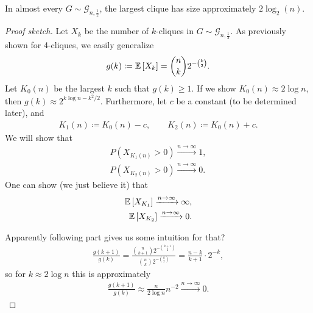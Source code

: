 \begin{theorem}
    In almost every $G \sim \mathcal{G}_{n, \frac{1}{2}}$, the largest clique has size approximately $2 \log_2(n)$.
\end{theorem}
\begin{proof}[Proof sketch]
    Let $X_k$ be the number of $k$-cliques in $G \sim \mathcal{G}_{n, \frac{1}{2}}$.
    As previously shown for 4-cliques, we easily generalize
    \begin{align*}
        g(k) \coloneqq \mathbb{E}\left[X_k\right] = \binom{n}{k}2^{-\binom{k}{2}}.
    \end{align*}
    Let $K_0(n)$ be the largest $k$ such that $g(k) \geq 1$.
    If we show $K_0(n) \approx 2 \log n$, then $g(k) \approx 2^{k\log n - k^2/2}$.
    Furthermore, let $c$ be a constant (to be determined later), and
    \begin{align}
        K_1(n) \coloneqq K_0(n) - c,\qquad K_2(n) \coloneqq K_0(n) + c.
    \end{align}
    We will show that
    \begin{align}
        P(X_{K_1(n)} > 0) \xrightarrow{n \rightarrow \infty} 1, \label{eq:ugly_probK1} \\
        P(X_{K_2(n)} > 0) \xrightarrow{n \rightarrow \infty} 0. \label{eq:ugly_probK2}
    \end{align}
    One can show (we just believe it) that
    \begin{align}
        \mathbb{E}\left[X_{K_1}\right] \xrightarrow{n \rightarrow \infty} \infty, \label{eq:ugly_expectK1} \\
        \mathbb{E}\left[X_{K_2}\right] \xrightarrow{n \rightarrow \infty} 0. \label{eq:ugly_expectK2}
    \end{align}

    Apparently following part gives us some intuition for that?
    \begin{align}
        \frac{g(k+1)}{g(k)} = \frac{\binom{n}{k+1}2^{-\binom{k+1}{2}}}{\binom{n}{k}2^{-\binom{k}{2}}}
        = \frac{n-k}{k+1}\cdot 2^{-k},
    \end{align}
    so for $k \approx 2 \log n$ this is approximately
    \begin{align}
        \frac{g(k+1)}{g(k)} \approx \frac{n}{2 \log n}n^{-2} \xrightarrow{n \rightarrow \infty} 0.
    \end{align}


\end{proof}
